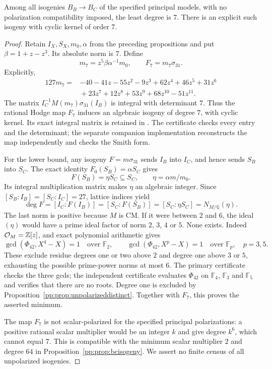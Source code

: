 \begin{proposition}
\label{pp:prop:mindegree}
Among all isogenies $B_B\to B_C$ of the specified principal models,
with no polarization compatibility imposed, the least degree is $7$.
There is an explicit such isogeny with cyclic kernel of order $7$.
\end{proposition}
\begin{proof}
Retain $I_X,S_X,m_0,\alpha$ from the preceding propositions and put
$\beta=1+z-z^3$. Its absolute norm is $7$. Define
\[
 m_7=z^5\beta\alpha^{-1}m_0,\qquad F_7=m_7\sigma_{31}.
\]
Explicitly,
\[
\begin{split}
127m_7={}&-40-41z-55z^2-9z^3+62z^4+46z^5+31z^6\\
       &{}+23z^7+12z^8+53z^9+68z^{10}-51z^{11}.
\end{split}
\]
The matrix $I_C^{-1}M(m_7)\sigma_{31}(I_B)$ is integral with
determinant $7$. Thus the rational Hodge map $F_7$ induces an algebraic
isogeny of degree $7$, with cyclic kernel. Its exact integral matrix is
retained in .
The certificate 
checks every entry and the determinant; the separate companion
implementation 
reconstructs the map independently and checks the Smith form.

For the lower bound, any isogeny $F=m\sigma_{31}$ sends $I_B$ into
$I_C$, and hence sends $S_B$ into $S_C$. The exact identity
$F_0(S_B)=\alpha S_C$ gives
\[
 F(S_B)=\eta S_C\subseteq S_C,\qquad \eta=\alpha m/m_0.
\]
Its integral multiplication matrix makes $\eta$ an algebraic integer.
Since $[S_B:I_B]=[S_C:I_C]=27$, lattice indices yield
\[
 \deg F=[I_C:F(I_B)]=[S_C:F(S_B)]
       =[S_C:\eta S_C]=N_{M/\mathbb Q}(\eta).
\]
The last norm is positive because $M$ is CM. If it were between $2$
and $6$, the ideal $(\eta)$ would have a prime ideal factor of norm
$2$, $3$, $4$ or $5$. None exists. Indeed $\mathcal O_M=\mathbb Z[z]$, and exact
polynomial arithmetic gives
\[
 \gcd(\Phi_{42},X^4-X)=1\quad\text{over }\mathbb F_2,
 \qquad
 \gcd(\Phi_{42},X^p-X)=1\quad\text{over }\mathbb F_p,
 \quad p=3,5.
\]
These exclude residue degrees one or two above $2$ and degree one
above $3$ or $5$, exhausting the possible prime-power norms at most
$6$. The primary certificate checks the three gcds; the independent
certificate evaluates $\Phi_{42}$ on $\mathbb F_4$, $\mathbb F_3$
and $\mathbb F_5$ and verifies that there are no roots.
Degree one is excluded by Proposition~\ref{pp:prop:unpolarizeddistinct}.
Together with $F_7$, this proves the asserted minimum.

The map $F_7$ is not scalar-polarized for the specified principal
polarizations: a positive rational scalar multiplier would be an
integer $k$ and give degree $k^6$, which cannot equal $7$.
This is compatible with the minimum scalar multiplier $2$ and degree
$64$ in Proposition~\ref{pp:prop:bcisogeny}. We assert no finite census
of all unpolarized isogenies.
\end{proof}

